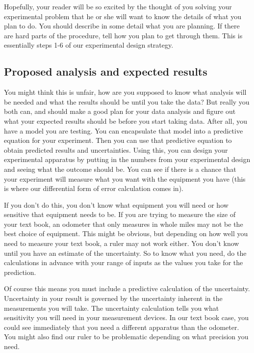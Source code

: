\documentclass[twoside,11pt,ShortChapTitles]{BYUTextbook}
\begin{document}
Hopefully, your reader will be so excited by the thought of you solving your
experimental problem that he or she will want to know the details of what
you plan to do. You should describe in some detail what you are planning. If
there are hard parts of the procedure, tell how you plan to get through
them. This is essentially steps 1-6 of our experimental design strategy.

\subsection{Proposed analysis and expected results}

You might think this is unfair, how are you supposed to know what analysis
will be needed and what the results should be until you take the data? But
really you both can, and should make a good plan for your data analysis and
figure out what your expected results should be before you start taking
data. After all, you have a model you are testing. You can encapsulate that
model into a predictive equation for your experiment. Then you can use that
predictive equation to obtain predicted results and uncertainties. Using
this, you can design your experimental apparatus by putting in the numbers
from your experimental design and seeing what the outcome should be. You can
see if there is a chance that your experiment will measure what you want
with the equipment you have (this is where our differential form of error
calculation comes in).

If you don't do this, you don't know what equipment you will need or how
sensitive that equipment needs to be. If you are trying to measure the size
of your text book, an odometer that only measures in whole miles may not be
the best choice of equipment. This might be obvious, but depending on how
well you need to measure your text book, a ruler may not work either. You
don't know until you have an estimate of the uncertainty. So to know what
you need, do the calculations in advance with your range of inputs as the
values you take for the prediction.

Of course this means you must include a predictive calculation of the
uncertainty. Uncertainty in your result is governed by the uncertainty
inherent in the measurements you will take. The uncertainty calculation
tells you what sensitivity you will need in your measurement devices. In our
text book case, you could see immediately that you need a different
apparatus than the odometer. You might also find our ruler to be problematic
depending on what precision you need.
\end{document}
